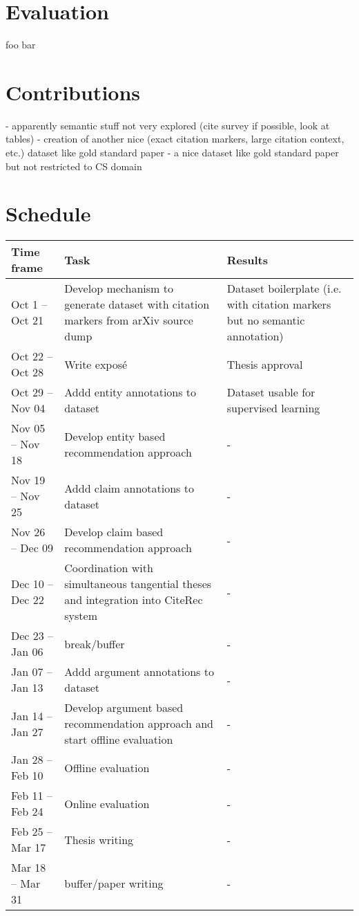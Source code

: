 \documentclass{proseminar}
\begin{document}
\section{Evaluation}
foo bar

\section{Contributions}
- apparently semantic stuff not very explored (cite survey if possible, look at tables)  
- creation of another nice (exact citation markers, large citation context, etc.) dataset like gold standard paper\cite{Faerber2018}  
- a nice dataset like gold standard paper\cite{Faerber2018} but not restricted to CS domain

\section{Schedule}
\begin{table*}
\centering
\begin{tabular}{|p{2.5cm}|p{6cm}|p{4cm}|} \hline
Time frame&Task&Results\\ \hline
Oct 1 -- Oct 21 & Develop mechanism to generate dataset with citation markers from arXiv source dump & Dataset boilerplate (i.e. with citation markers but no semantic annotation)\\ \hline
Oct 22 -- Oct 28 & Write expos\'e  & Thesis approval\\ \hline
Oct 29 -- Nov 04 & Addd entity annotations to dataset & Dataset usable for supervised learning\\ \hline
Nov 05 -- Nov 18 & Develop entity based recommendation approach & -\\ \hline
Nov 19 -- Nov 25 & Addd claim annotations to dataset & -\\ \hline
Nov 26 -- Dec 09 & Develop claim based recommendation approach & -\\ \hline
Dec 10 -- Dec 22 & Coordination with simultaneous tangential theses and integration into CiteRec system & -\\ \hline
Dec 23 -- Jan 06 & break/buffer & -\\ \hline
Jan 07 -- Jan 13 & Addd argument annotations to dataset & -\\ \hline
Jan 14 -- Jan 27 & Develop argument based recommendation approach and start offline evaluation & -\\ \hline
Jan 28 -- Feb 10 & Offline evaluation & -\\ \hline
Feb 11 -- Feb 24 & Online evaluation & -\\ \hline
Feb 25 -- Mar 17 & Thesis writing & -\\ \hline
Mar 18 -- Mar 31 & buffer/paper writing & -\\ \hline\end{tabular}
\end{table*}
\end{document}

